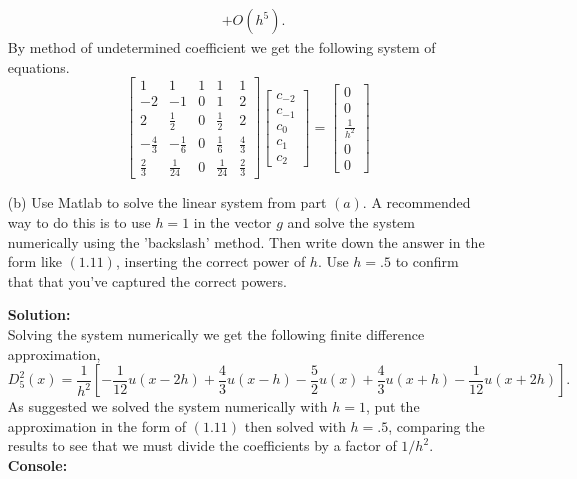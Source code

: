 \documentclass[12pt]{article}
\makeatletter
\theoremstyle{homework}
\newenvironment{exercise}[1]
{\def\@currentlabel{#1}\exercisecore}
{\endexercisecore}
\newcommand{\localhead}[1]{\par\smallskip\noindent\textbf{#1}\nobreak\\}%
\newcommand\solution{\localhead{Solution:}}
\makeatother
\begin{document}
\begin{exercise}{Problem P9}
\begin{enumerate}
\begin{align*}
              &+ O(h^5).
    \end{align*}
    By method of undetermined coefficient we get the following system of equations. 
    \begin{equation*}
      \begin{bmatrix}
        1 & 1 & 1 & 1 & 1 \\
        -2 & -1 & 0 & 1 & 2\\
        2 & \frac{1}{2}& 0 &\frac{1}{2}&2\\
        -\frac{4}{3}& -\frac{1}{6}&0&\frac{1}{6} & \frac{4}{3}\\
        \frac{2}{3} & \frac{1}{24} & 0 & \frac{1}{24}&\frac{2}{3}
      \end{bmatrix}
      \begin{bmatrix}
        c_{-2}\\
        c_{-1}\\
        c_{0}\\
        c_{1}\\
        c_{2}
      \end{bmatrix}
      = 
      \begin{bmatrix}
        0\\
        0\\
        \frac{1}{h^2}\\
        0\\
        0
      \end{bmatrix}
    \end{equation*}

    \item[(b)] Use Matlab to solve the linear system from part $(a)$. A recommended way to do this is 
    to use $h = 1$ in the vector $g$ and solve the system numerically using the 'backslash' method. Then
    write down the answer in the form like $(1.11)$, inserting the correct power of $h$. Use $h = .5$ 
    to confirm that that you've captured the correct powers. 
    \solution Solving the system numerically we get the following finite difference approximation, 
    \begin{equation*}
      D^2_5(x) = \frac{1}{h^2}\left[-\frac{1}{12}u(x - 2h) + \frac{4}{3}u(x - h) - \frac{5}{2}u(x) + \frac{4}{3}u(x + h) -\frac{1}{12}u(x + 2h)\right].
    \end{equation*}
    As suggested we solved the system numerically with $h = 1$, put the approximation in the form of $(1.11)$ then solved with $h = .5$, comparing the results to 
    see that we must divide the coefficients by a factor of $1/h^2$. \\


    \textbf{Console:}
    \begin{center}
      
    \end{center}
  \end{enumerate}
\end{exercise}
\vspace{1in}
\end{document}
